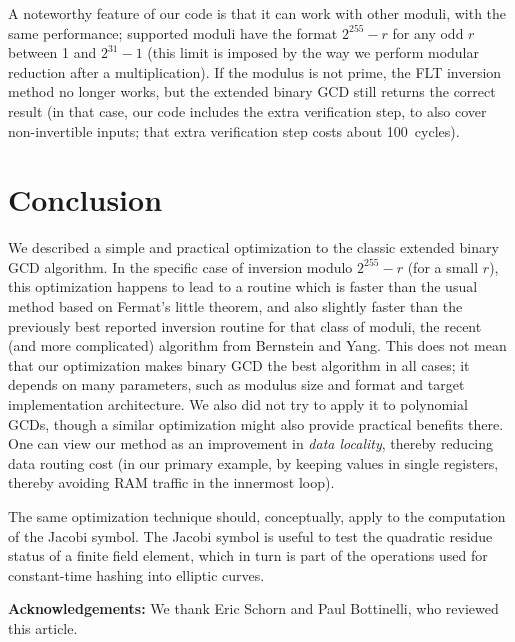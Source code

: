 \documentclass{llncs}
\begin{document}
A noteworthy feature of our code is that it can work with other moduli,
with the same performance; supported moduli have the format $2^{255}-r$
for any odd $r$ between 1 and $2^{31}-1$ (this limit is imposed by the
way we perform modular reduction after a multiplication). If the modulus
is not prime, the FLT inversion method no longer works, but the extended
binary GCD still returns the correct result (in that case, our code
includes the extra verification step, to also cover non-invertible inputs;
that extra verification step costs about 100~cycles).

\section{Conclusion}

We described a simple and practical optimization to the classic extended
binary GCD algorithm. In the specific case of inversion modulo
$2^{255}-r$ (for a small $r$), this optimization happens to lead to a
routine which is faster than the usual method based on Fermat's little
theorem, and also slightly faster than the previously best reported
inversion routine for that class of moduli, the recent (and more
complicated) algorithm from Bernstein and Yang. This does not mean that
our optimization makes binary GCD the best algorithm in all cases; it
depends on many parameters, such as modulus size and format and target
implementation architecture. We also did not try to apply it to
polynomial GCDs, though a similar optimization might also provide
practical benefits there. One can view our method as an improvement in
\emph{data locality}, thereby reducing data routing cost (in our primary
example, by keeping values in single registers, thereby avoiding RAM
traffic in the innermost loop).

The same optimization technique should, conceptually, apply to the
computation of the Jacobi symbol\cite{Coh1993}. The Jacobi symbol
is useful to test the quadratic residue status of a finite field element,
which in turn is part of the operations used for constant-time hashing
into elliptic curves\cite{DraftHashToCurve09}.

\vspace{2ex}
\noindent\textsf{\textbf{Acknowledgements:}} We thank Eric Schorn
and Paul Bottinelli, who reviewed this article.
\end{document}
